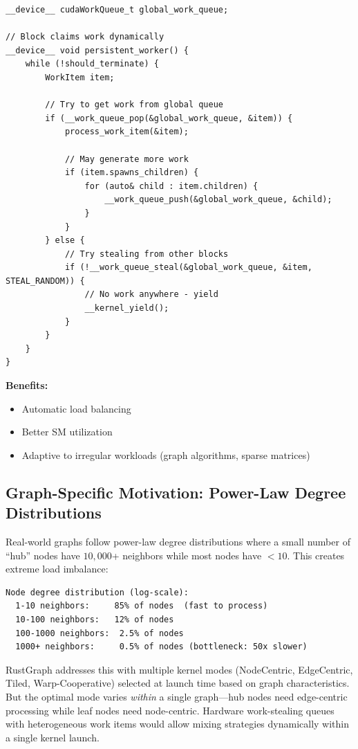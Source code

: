 \documentclass[11pt,a4paper]{article}
\newenvironment{benefitsbox}{%
    \vspace{6pt}%
    \noindent\textbf{Benefits:}%
    \begin{itemize}[leftmargin=1.5em,topsep=2pt,itemsep=1pt]%
}{%
    \end{itemize}%
    \vspace{6pt}%
}
\begin{document}
\begin{lstlisting}[style=cstyle,title={Device-wide work queue}]
__device__ cudaWorkQueue_t global_work_queue;

// Block claims work dynamically
__device__ void persistent_worker() {
    while (!should_terminate) {
        WorkItem item;

        // Try to get work from global queue
        if (__work_queue_pop(&global_work_queue, &item)) {
            process_work_item(&item);

            // May generate more work
            if (item.spawns_children) {
                for (auto& child : item.children) {
                    __work_queue_push(&global_work_queue, &child);
                }
            }
        } else {
            // Try stealing from other blocks
            if (!__work_queue_steal(&global_work_queue, &item, STEAL_RANDOM)) {
                // No work anywhere - yield
                __kernel_yield();
            }
        }
    }
}
\end{lstlisting}

\begin{benefitsbox}
    \item Automatic load balancing
    \item Better SM utilization
    \item Adaptive to irregular workloads (graph algorithms, sparse matrices)
\end{benefitsbox}

\subsection{Graph-Specific Motivation: Power-Law Degree Distributions}

Real-world graphs follow power-law degree distributions where a small number of ``hub'' nodes have $10{,}000$+ neighbors while most nodes have $<10$. This creates extreme load imbalance:

\begin{Verbatim}[fontsize=\small,frame=single,framesep=3mm]
Node degree distribution (log-scale):
  1-10 neighbors:     85% of nodes  (fast to process)
  10-100 neighbors:   12% of nodes
  100-1000 neighbors:  2.5% of nodes
  1000+ neighbors:     0.5% of nodes (bottleneck: 50x slower)
\end{Verbatim}

RustGraph addresses this with multiple kernel modes (NodeCentric, EdgeCentric, Tiled, Warp-Cooperative) selected at launch time based on graph characteristics. But the optimal mode varies \textit{within} a single graph---hub nodes need edge-centric processing while leaf nodes need node-centric. Hardware work-stealing queues with heterogeneous work items would allow mixing strategies dynamically within a single kernel launch.
\end{document}

